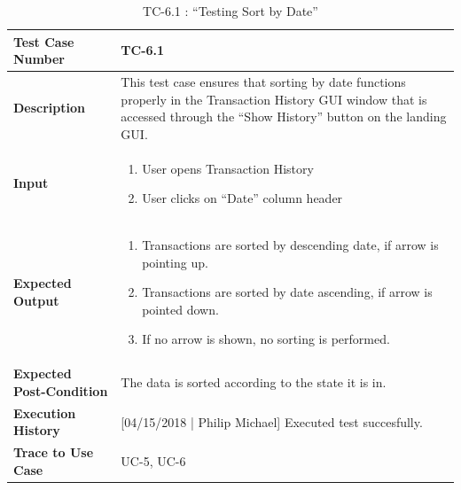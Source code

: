 \documentclass[12pt]{article}
\begin{document}
\begin{table}[H]
\caption{TC-6.1 : “Testing Sort by Date”}
\begin{center}
\begin{tabular}{|p{5.5	cm}|p{11cm}|}
  \hline
  \bf Test Case Number & TC-6.1\\\hline
  \bf Description & This test case ensures that sorting by date functions properly in the Transaction History GUI window that is accessed through the ``Show History'' button on the landing GUI.\\\hline
  \bf Input &
  \begin{enumerate}
  \item User opens Transaction History
  \item User clicks on ``Date'' column header
  \end{enumerate}
  \\\hline
  \bf Expected Output &
  \begin{enumerate}
  \item Transactions are sorted by descending date, if arrow is pointing up.
  \item Transactions are sorted by date ascending, if arrow is pointed down.
  \item If no arrow is shown, no sorting is performed.
  \end{enumerate}
  \\\hline
  \bf Expected Post-Condition & The data is sorted according to the state it is in.\\\hline
  \bf Execution History & [04/15/2018 | Philip Michael] Executed test succesfully.\\\hline
  \bf Trace to Use Case & UC-5, UC-6\\

  \hline
\end{tabular}
\end{center}
\end{table}
\end{document}
